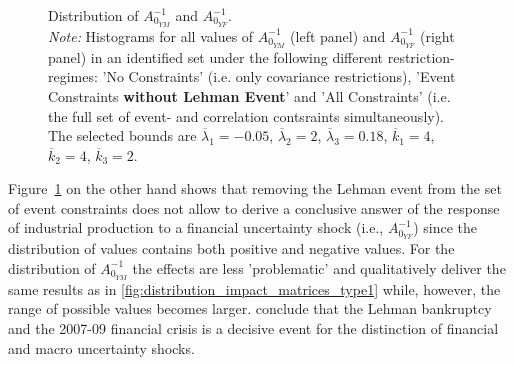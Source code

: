 \documentclass[a4paper,11pt,listof=nochaptergap,oneside,pointednumbers,bibtotoc,bigheadings,liststotoc,hidelinks]{scrbook}
\theoremstyle{mysatz}
\theoremstyle{mydefinition}
\theoremstyle{mytheorem}
\theoremstyle{mybemerkung}
\begin{document}
\begin{figure}[!h]
   \centering
   \setlength\fboxsep{0pt}
   \setlength\fboxrule{0pt}
      \caption[Distribution of $A_{0_{YM}}^{-1}$ and $A_{0_{YF}}^{-1}$.]{Distribution of $A_{0_{YM}}^{-1}$ and $A_{0_{YF}}^{-1}$.\\
      \textit{Note:} Histograms for all values of $A_{0_{YM}}^{-1}$ (left panel) and $A_{0_{YF}}^{-1}$ (right panel) in an identified set under the following different restriction-regimes: 'No Constraints' (i.e. only covariance restrictions), 'Event Constraints \textbf{without Lehman Event}' and 'All Constraints' (i.e. the full set of event- and correlation contsraints simultaneously). The selected bounds are $\overline{\lambda}_1 = -0.05$, $\overline{\lambda}_2 = 2$, $\overline{\lambda}_3 = 0.18$, $\overline{k}_1 = 4$, $\overline{k}_2 = 4$, $\overline{k}_3 = 2$.}   \label{fig:distribution_impact_matrices_type2}
\end{figure}

Figure~\ref{fig:distribution_impact_matrices_type2} on the other hand shows that removing the Lehman event from the set of event constraints does not allow to derive a conclusive answer of the response of industrial production to a financial uncertainty shock (i.e., $A_{0_{YF}}^{-1}$) since the distribution of values contains both positive and negative values. For the distribution of $A_{0_{YM}}^{-1}$ the effects are less 'problematic' and qualitatively deliver the same results as in \ref{fig:distribution_impact_matrices_type1} while, however, the range of possible values becomes larger. \citet{ludvigsonetal:19} conclude that the Lehman bankruptcy and the 2007-09 financial crisis is a decisive event for the distinction of financial and macro uncertainty shocks. 
\end{document}
